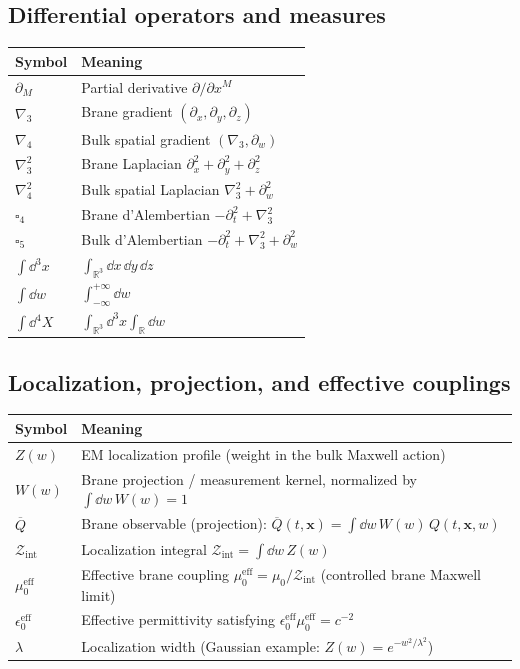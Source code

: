 \documentclass[11pt]{article}
\begin{document}
\subsection*{Differential operators and measures}

\begin{center}
\begin{tabular}{@{}ll@{}}
\toprule
Symbol & Meaning \\
\midrule
$\partial_M$ & Partial derivative $\partial/\partial x^M$ \\
$\nabla_3$ & Brane gradient $(\partial_x,\partial_y,\partial_z)$ \\
$\nabla_4$ & Bulk spatial gradient $(\nabla_3,\partial_w)$ \\
$\nabla_3^2$ & Brane Laplacian $\partial_x^2+\partial_y^2+\partial_z^2$ \\
$\nabla_4^2$ & Bulk spatial Laplacian $\nabla_3^2+\partial_w^2$ \\
$\square_4$ & Brane d'Alembertian $-\partial_t^2+\nabla_3^2$ \\
$\square_5$ & Bulk d'Alembertian $-\partial_t^2+\nabla_3^2+\partial_w^2$ \\
$\int \dd^3x$ & $\int_{\mathbb{R}^3}\dd x\,\dd y\,\dd z$ \\
$\int \dd w$ & $\int_{-\infty}^{+\infty}\dd w$ \\
$\int \dd^4X$ & $\int_{\mathbb{R}^3}\dd^3x\int_{\mathbb{R}}\dd w$ \\
\bottomrule
\end{tabular}
\end{center}

\subsection*{Localization, projection, and effective couplings}

\begin{center}
\begin{tabular}{@{}ll@{}}
\toprule
Symbol & Meaning \\
\midrule
$Z(w)$ & EM localization profile (weight in the bulk Maxwell action) \\
$W(w)$ & Brane projection / measurement kernel, normalized by $\int \dd w\,W(w)=1$ \\
$\overline{Q}$ & Brane observable (projection): $\overline{Q}(t,\mathbf{x})=\int \dd w\,W(w)\,Q(t,\mathbf{x},w)$ \\
$\mathcal{Z}_{\mathrm{int}}$ & Localization integral $\mathcal{Z}_{\mathrm{int}}=\int \dd w\,Z(w)$ \\
$\mu_0^{\mathrm{eff}}$ & Effective brane coupling $\mu_0^{\mathrm{eff}}=\mu_0/\mathcal{Z}_{\mathrm{int}}$ (controlled brane Maxwell limit) \\
$\epsilon_0^{\mathrm{eff}}$ & Effective permittivity satisfying $\epsilon_0^{\mathrm{eff}}\mu_0^{\mathrm{eff}}=c^{-2}$ \\
$\lambda$ & Localization width (Gaussian example: $Z(w)=e^{-w^2/\lambda^2}$) \\
\bottomrule
\end{tabular}
\end{center}
\end{document}
